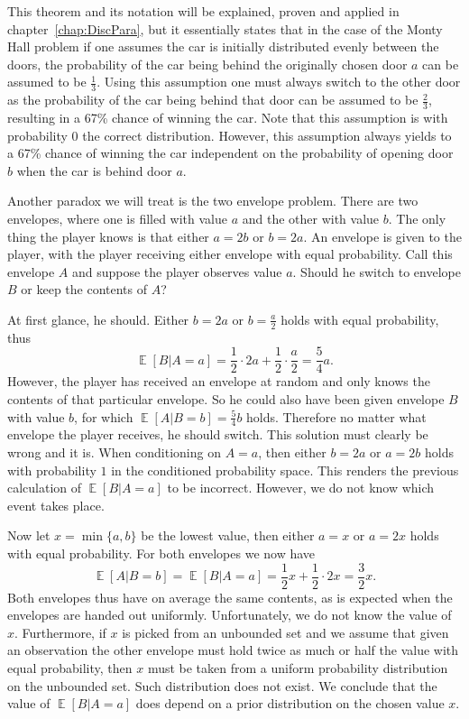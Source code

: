 \documentclass[twoside,a4paper]{report}
\theoremstyle{plain}
\theoremstyle{definition}
\theoremstyle{remark}
\numberwithin{equation}{chapter}
\DeclareMathOperator{\E}{\mathbb{E}}
\DeclareMathOperator{\1}{\mathbbm{1}}
\begin{document}
This theorem and its notation will be explained, proven and applied in chapter~\ref{chap:DiscPara}, but it essentially states that in the case of the Monty Hall problem if one assumes the car is initially distributed evenly between the doors, the probability of the car being behind the originally chosen door $a$ can be assumed to be $\frac{1}{3}$. Using this assumption one must always switch to the other door as the probability of the car being behind that door can be assumed to be $\frac{2}{3}$, resulting in a 67\% chance of winning the car. Note that this assumption is with probability 0 the correct distribution. However, this assumption always yields to a 67\% chance of winning the car independent on the probability of opening door $b$ when the car is behind door $a$.

Another paradox we will treat is the two envelope problem. There are two envelopes, where one is filled with value $a$ and the other with value $b$. The only thing the player knows is that either $a=2b$ or $b=2a$. An envelope is given to the player, with the player receiving either envelope with equal probability. Call this envelope $A$ and suppose the player observes value $a$. Should he switch to envelope $B$ or keep the contents of $A$?

At first glance, he should. Either $b=2a$ or $b=\frac{a}{2}$ holds with equal probability, thus \[\E[B|A=a]=\frac{1}{2}\cdot2a+\frac{1}{2}\cdot\frac{a}{2}=\frac{5}{4}a.\]
However, the player has received an envelope at random and only knows the contents of that particular envelope. So he could also have been given envelope $B$ with value $b$, for which $\E[A|B=b]=\frac{5}{4}b$ holds. Therefore no matter what envelope the player receives, he should switch. This solution must clearly be wrong and it is. When conditioning on $A=a$, then either $b=2a$ or $a=2b$ holds with probability $1$ in the conditioned probability space. This renders the previous calculation of $\E[B|A=a]$ to be incorrect. However, we do not know which event takes place.

Now let $x=\min\{a,b\}$ be the lowest value, then either $a=x$ or $a=2x$ holds with equal probability. For both envelopes we now have
\[
\E[A|B=b]=\E[B|A=a]=\frac{1}{2}x+\frac{1}{2}\cdot2x=\frac{3}{2}x.
\]
Both envelopes thus have on average the same contents, as is expected when the envelopes are handed out uniformly. Unfortunately, we do not know the value of $x$. Furthermore, if $x$ is picked from an unbounded set and we assume that given an observation the other envelope must hold twice as much or half the value with equal probability, then $x$ must be taken from a uniform probability distribution on the unbounded set. Such distribution does not exist. We conclude that the value of $\E[B|A=a]$ does depend on a prior distribution on the chosen value $x$.
\end{document}
